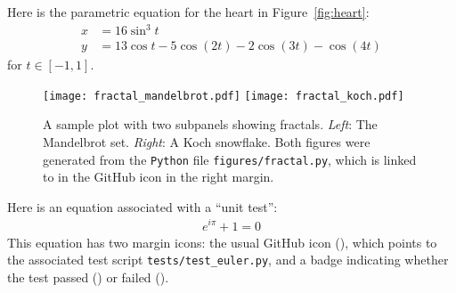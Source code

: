 \documentclass[modern]{aastex62}
\begin{document}
Here is the parametric equation for the heart in Figure~\ref{fig:heart}:
%
\begin{align}
    \label{eq*:heart}
    x & = 16 \sin^3 t                          \nonumber \\
    y & = 13 \cos t - 5 \cos\left(2 t\right) -
    2 \cos\left(3 t\right) - \cos\left(4 t\right)
\end{align}
%
for $t \in [-1, 1]$.

\begin{figure}[t!]
    \begin{centering}
        \texttt{[image: fractal\_mandelbrot.pdf]}
        \texttt{[image: fractal\_koch.pdf]}
        \caption{
            A sample plot with two subpanels showing fractals. \emph{Left}: The Mandelbrot set. \emph{Right}: A Koch snowflake. Both figures were generated from the \texttt{Python} file \texttt{figures/fractal.py}, which is linked to in the GitHub icon in the right margin.
        }
        \label{fig:fractal}
    \end{centering}
\end{figure}

Here is an equation associated with a ``unit test'':
%
\begin{align}
    \label{eq:euler}
    e^{i\pi} + 1 = 0
\end{align}
%
This equation has two margin icons: the usual GitHub icon (\GitHubIcon), which points to the associated test script \texttt{tests/test\_euler.py}, and a badge indicating whether the test passed
(\TestPassIcon) or failed (\TestFailIcon).

\clearpage

\end{document}
